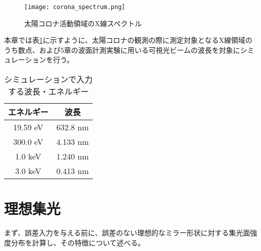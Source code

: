 \begin{figure}[ht]
\centering
\texttt{[image: corona\_spectrum.png]}
\caption{太陽コロナ活動領域のX線スペクトル}
\label{fig:corona_spectrum}
\end{figure}

本章では表\ref{tb:simulation_target_energy}に示すように、太陽コロナの観測の際に測定対象となるX線領域のうち数点、および5章の波面計測実験に用いる可視光ビームの波長を対象にシミュレーションを行う。

\begin{table}[!ht]
\begin{center}
  \begin{tabular}{|c|c|} \hline
    エネルギー & 波長 \\ \hline
    19.59 eV & 632.8 nm \\
    300.0 eV & 4.133 nm  \\
    1.0 keV & 1.240 nm  \\
    3.0 keV & 0.413 nm  \\ \hline
  \end{tabular}
  \caption{シミュレーションで入力する波長・エネルギー}
  \label{tb:simulation_target_energy}
\end{center}
\end{table}

\clearpage
\newpage

\section{理想集光}
\label{chap2_ideal_focusing}

まず、誤差入力を与える前に、誤差のない理想的なミラー形状に対する集光面強度分布を計算し、その特徴について述べる。

\begin{comment}
\begin{figure}[!ht]
\centering

\subfloat[可視光(632.8nm)]{
    \texttt{[image: ideal/visible\_light\_focus\_abs.png]}
    \label{fig:visible_light_ideal_focus_abs}
}
\subfloat[300eV]{
    \centering
    \texttt{[image: ideal/300eV\_focus\_abs.png]}
    \label{fig:300eV_ideal_focus_abs}
}
\subfloat[1keV]{
    \centering
    \texttt{[image: ideal/1keV\_focus\_abs.png]}
    \label{fig:1keV_ideal_focus_abs}
}
\subfloat[3keV]{
    \centering
    \texttt{[image: ideal/3keV\_focus\_abs.png]}
    \label{fig:3keV_ideal_focus_abs}
}
\caption[]{理想的なミラーの各波長に対する集光波面}
\label{fig:fwhm_explanation}
\end{figure}
\end{comment}

